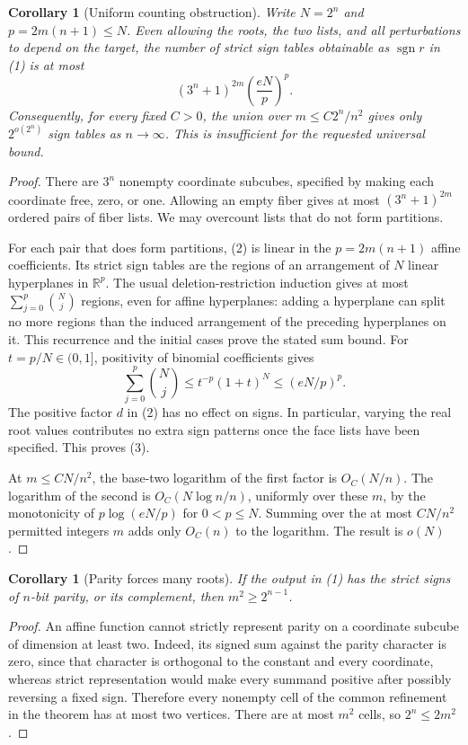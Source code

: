 \documentclass[11pt]{article}
\newtheorem{corollary}[theorem]{Corollary}
\begin{document}
\begin{corollary}[Uniform counting obstruction]
Write $N=2^n$ and $p=2m(n+1)\le N$. Even allowing the roots,
the two lists, and all perturbations to depend on the target, the
number of strict sign tables obtainable as $\operatorname{sgn}r$
in (1) is at most
\[
 (3^n+1)^{2m}\left(\frac{eN}{p}\right)^p.
\tag{3}
\]
Consequently, for every fixed $C>0$, the union over
$m\le C2^n/n^2$ gives only $2^{o(2^n)}$ sign tables as
$n\to\infty$. This is insufficient for the requested universal bound.
\end{corollary}
\begin{proof}
There are $3^n$ nonempty coordinate subcubes, specified by making
each coordinate free, zero, or one. Allowing an empty fiber gives
at most $(3^n+1)^{2m}$ ordered pairs of fiber lists. We may
overcount lists that do not form partitions.

For each pair that does form partitions, (2) is linear in the
$p=2m(n+1)$ affine coefficients. Its strict sign tables are the
regions of an arrangement of $N$ linear hyperplanes in
$\mathbb R^p$. The usual deletion-restriction induction gives at
most $\sum_{j=0}^p\binom Nj$ regions, even for affine hyperplanes:
adding a hyperplane can split no more regions than the induced
arrangement of the preceding hyperplanes on it. This recurrence
and the initial cases prove the stated sum bound.
For $t=p/N\in(0,1]$, positivity of binomial coefficients gives
\[
 \sum_{j=0}^p\binom Nj\le t^{-p}(1+t)^N
                         \le(eN/p)^p.
\]
The positive factor $d$ in (2) has no effect on signs. In particular,
varying the real root values contributes no extra sign patterns once
the face lists have been specified. This proves (3).

At $m\le C N/n^2$, the base-two logarithm of the first factor is
$O_C(N/n)$. The logarithm of the second is
$O_C(N\log n/n)$, uniformly over these $m$, by the monotonicity
of $p\log(eN/p)$ for $0<p\le N$. Summing over the at most
$C N/n^2$ permitted integers $m$ adds only $O_C(n)$ to the
logarithm. The result is $o(N)$.
\end{proof}

\begin{corollary}[Parity forces many roots]
If the output in (1) has the strict signs of $n$-bit parity, or its
complement, then $m^2\ge2^{n-1}$.
\end{corollary}
\begin{proof}
An affine function cannot strictly represent parity on a coordinate
subcube of dimension at least two. Indeed, its signed sum against
the parity character is zero, since that character is orthogonal to
the constant and every coordinate, whereas strict representation
would make every summand positive after possibly reversing a fixed
sign. Therefore every nonempty cell of the common refinement in the
theorem has at most two vertices. There are at most $m^2$ cells,
so $2^n\le2m^2$.
\end{proof}
\end{document}
